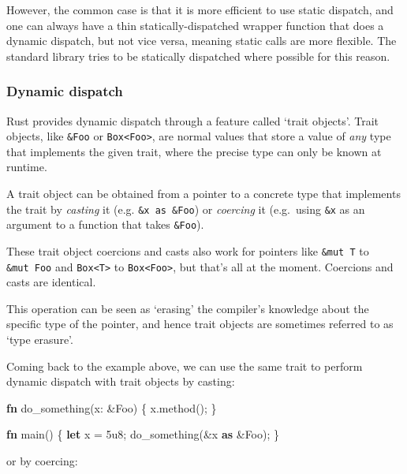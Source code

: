 \documentclass[a4paper,]{book}
\newenvironment{Shaded}{\begin{snugshade}}{\end{snugshade}}
\newcommand{\KeywordTok}[1]{\textcolor[rgb]{0.13,0.29,0.53}{\textbf{{#1}}}}
\newcommand{\DecValTok}[1]{\textcolor[rgb]{0.00,0.00,0.81}{{#1}}}
\newcommand{\NormalTok}[1]{{#1}}
\begin{document}
However, the common case is that it is more efficient to use static
dispatch, and one can always have a thin statically-dispatched wrapper
function that does a dynamic dispatch, but not vice versa, meaning
static calls are more flexible. The standard library tries to be
statically dispatched where possible for this reason.

\subsubsection{Dynamic dispatch}\label{dynamic-dispatch}

Rust provides dynamic dispatch through a feature called `trait objects'.
Trait objects, like \texttt{\&Foo} or
\texttt{Box\textless{}Foo\textgreater{}}, are normal values that store a
value of \emph{any} type that implements the given trait, where the
precise type can only be known at runtime.

A trait object can be obtained from a pointer to a concrete type that
implements the trait by \emph{casting} it (e.g. \texttt{\&x\ as\ \&Foo})
or \emph{coercing} it (e.g.~using \texttt{\&x} as an argument to a
function that takes \texttt{\&Foo}).

These trait object coercions and casts also work for pointers like
\texttt{\&mut\ T} to \texttt{\&mut\ Foo} and
\texttt{Box\textless{}T\textgreater{}} to
\texttt{Box\textless{}Foo\textgreater{}}, but that's all at the moment.
Coercions and casts are identical.

This operation can be seen as `erasing' the compiler's knowledge about
the specific type of the pointer, and hence trait objects are sometimes
referred to as `type erasure'.

Coming back to the example above, we can use the same trait to perform
dynamic dispatch with trait objects by casting:

\begin{Shaded}
\begin{Highlighting}[]

\KeywordTok{fn} \NormalTok{do_something(x: &Foo) \{}
    \NormalTok{x.method();}
\NormalTok{\}}

\KeywordTok{fn} \NormalTok{main() \{}
    \KeywordTok{let} \NormalTok{x = }\DecValTok{5u8}\NormalTok{;}
    \NormalTok{do_something(&x }\KeywordTok{as} \NormalTok{&Foo);}
\NormalTok{\}}
\end{Highlighting}
\end{Shaded}

or by coercing:
\end{document}
